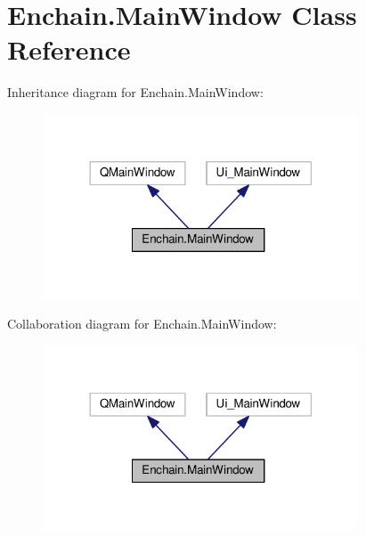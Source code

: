 \hypertarget{classEnchain_1_1MainWindow}{}\section{Enchain.\+Main\+Window Class Reference}
\label{classEnchain_1_1MainWindow}


Inheritance diagram for Enchain.\+Main\+Window\+:\nopagebreak
\begin{figure}[H]
\begin{center}
\leavevmode
\includegraphics[width=266pt]{classEnchain_1_1MainWindow__inherit__graph}
\end{center}
\end{figure}


Collaboration diagram for Enchain.\+Main\+Window\+:\nopagebreak
\begin{figure}[H]
\begin{center}
\leavevmode
\includegraphics[width=266pt]{classEnchain_1_1MainWindow__coll__graph}
\end{center}
\end{figure}
